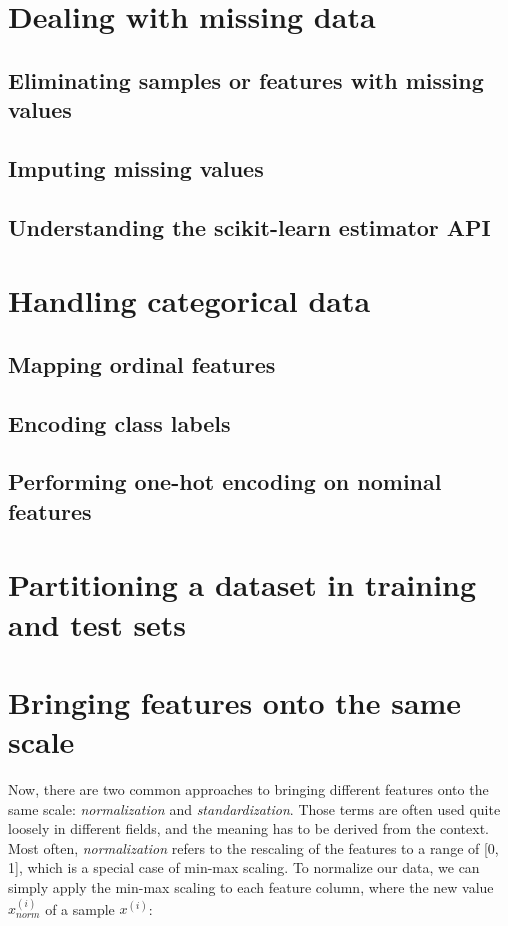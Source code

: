 \documentclass[letterpaper]{report}
\begin{document}
\section{Dealing with missing data}
\subsection{Eliminating samples or features with missing values}
\subsection{Imputing missing values}
\subsection{Understanding the scikit-learn estimator API}
\section{Handling categorical data}
\subsection{Mapping ordinal features}
\subsection{Encoding class labels}
\subsection{Performing one-hot encoding on nominal features}
\section{Partitioning a dataset in training and test sets}
\section{Bringing features onto the same scale}

Now, there are two common approaches to bringing different features onto the same
scale: \textit{normalization} and \textit{standardization}. Those terms are often used quite loosely
in different fields, and the meaning has to be derived from the context. Most often,
\textit{normalization} refers to the rescaling of the features to a range of [0, 1], which is a
special case of min-max scaling.  To normalize our data, we can simply apply the
min-max scaling to each feature column, where the new value $x_{norm}^{(i)}$ of a sample  $x^{(i)}$:
\end{document}
